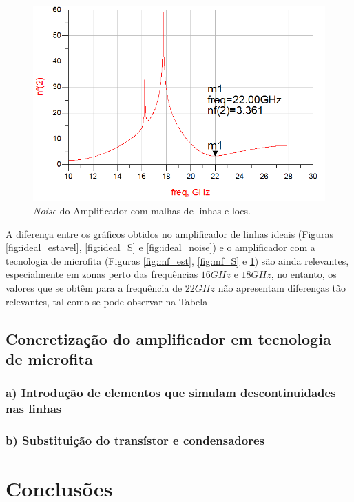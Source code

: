 \documentclass[11pt]{article}
\numberwithin{equation}{section}
\begin{document}
\begin{figure}[H]
	\centering
	\includegraphics[keepaspectratio=true, scale=0.45]{exps/mf_noise}
	\vspace{-0.5em}
	\caption{\textit{Noise} do Amplificador com malhas de linhas e locs.}
	\vspace{-0.8em}
	\label{fig:mf_noise}
\end{figure}



A diferença entre os gráficos obtidos no amplificador de linhas ideais (Figuras \ref{fig:ideal_estavel}, \ref{fig:ideal_S} e \ref{fig:ideal_noise}) e o amplificador com a tecnologia de microfita (Figuras \ref{fig:mf_est}, \ref{fig:mf_S} e \ref{fig:mf_noise}) são ainda relevantes, especialmente em zonas perto das frequências $ 16 GHz $ e $ 18 GHz $, no entanto, os valores que se obtêm para a frequência de $ 22 GHz $ não apresentam diferenças tão relevantes, tal como se pode observar na Tabela %


\subsection{Concretização do amplificador em tecnologia de microfita}

\subsubsection{a) Introdução de elementos que simulam descontinuidades nas linhas}

\subsubsection{b) Substituição do transístor e condensadores}

\section{Conclusões}
\end{document}
